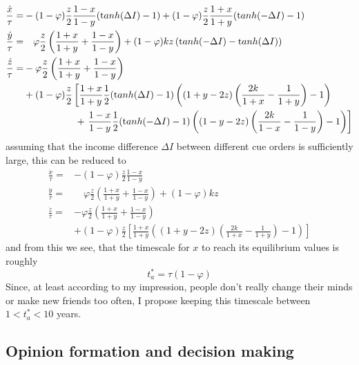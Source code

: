 \begin{align}
	\frac{\dot{x}}{\tau} =& -(1-\varphi)\frac{z}{2}\frac{1-x}{1-y}({\mathrm tanh}(\Delta I)-1) + (1-\varphi)\frac{z}{2}\frac{1+x}{1+y}({\mathrm tanh}(-\Delta I)-1) \\
\frac{\dot{y}}{\tau} =& \quad \varphi\frac{z}{2}\left( \frac{1+x}{1+y} + \frac{1-x}{1-y} \right) + (1-\varphi)kz\left( {\mathrm tanh}(-\Delta I) - {\mathrm tanh}(\Delta I) \right) \\
	\frac{\dot{z}}{\tau} =& -\varphi\frac{z}{2}\left( \frac{1+x}{1+y} + \frac{1-x}{1-y} \right) \nonumber \\
	& + (1-\varphi)\frac{z}{2} \left[ \frac{1+x}{1+y} \frac{1}{2}({\mathrm tanh}(\Delta I)-1) \left( (1+y-2z)\left( \frac{2k}{1+x}-\frac{1}{1+y} \right)-1 \right) \right. \nonumber \\
	& \hspace{1.9 cm} + \left.\frac{1-x}{1-y}\frac{1}{2}({\mathrm tanh}(-\Delta I)-1)\left( (1-y-2z)\left( \frac{2k}{1-x}-\frac{1}{1-y} \right)-1 \right)  \right]
	\label{avm_ode}
\end{align}
assuming that the income difference $\Delta I$ between different cue orders is sufficiently large, this can be reduced to
\begin{align}
	\frac{\dot{x}}{\tau} =& -(1-\varphi)\frac{z}{2}\frac{1-x}{1-y} \\
\frac{\dot{y}}{\tau} =& \quad \varphi\frac{z}{2}\left( \frac{1+x}{1+y} + \frac{1-x}{1-y} \right) + (1-\varphi)kz \\
	\frac{\dot{z}}{\tau} =& -\varphi\frac{z}{2}\left( \frac{1+x}{1+y} + \frac{1-x}{1-y} \right) \nonumber \\
	& + (1-\varphi)\frac{z}{2} \left[ \frac{1+x}{1+y} \left( (1+y-2z)\left( \frac{2k}{1+x}-\frac{1}{1+y} \right)-1 \right) \right]
	\label{avm_ode_reduced}
\end{align}
and from this we see, that the timescale for $x$ to reach its equilibrium values is roughly 
\begin{equation}
	t_a^* = \tau(1-\varphi)
	\label{avm_timescale}
\end{equation}
Since, at least according to my impression, people don't really change their minds or make new friends too often, I propose keeping this timescale between $1<t_a^*<10$ years.
\fi
\subsection{Opinion formation and decision making}
\label{sec:oppinion_formation_and_decision_making}

